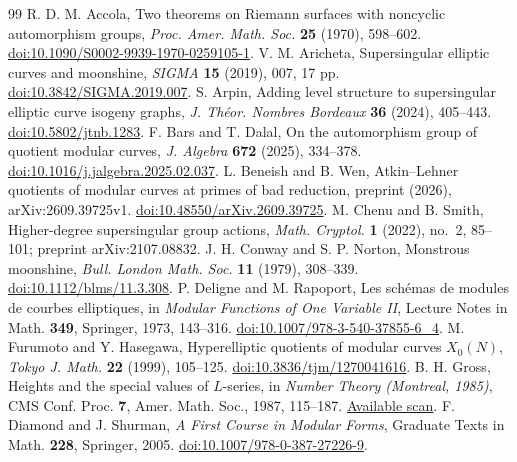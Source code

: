 \documentclass[11pt,a4paper]{article}
\theoremstyle{remark}\newtheorem{remark}[theorem]{Remark}
\numberwithin{equation}{section}
\begin{document}
	\begin{thebibliography}{99}\small
		 R. D. M. Accola, Two theorems on Riemann surfaces with noncyclic automorphism groups, \emph{Proc. Amer. Math. Soc.} \textbf{25} (1970), 598--602. \href{https://doi.org/10.1090/S0002-9939-1970-0259105-1}{doi:10.1090/S0002-9939-1970-0259105-1}.
		 V. M. Aricheta, Supersingular elliptic curves and moonshine, \emph{SIGMA} \textbf{15} (2019), 007, 17 pp. \href{https://doi.org/10.3842/SIGMA.2019.007}{doi:10.3842/SIGMA.2019.007}.
	 S. Arpin, Adding level structure to supersingular elliptic curve isogeny graphs, \emph{J. Th\'eor. Nombres Bordeaux} \textbf{36} (2024), 405--443. \href{https://doi.org/10.5802/jtnb.1283}{doi:10.5802/jtnb.1283}.
	 F. Bars and T. Dalal, On the automorphism group of quotient modular curves, \emph{J. Algebra} \textbf{672} (2025), 334--378. \href{https://doi.org/10.1016/j.jalgebra.2025.02.037}{doi:10.1016/j.jalgebra.2025.02.037}.
	 L. Beneish and B. Wen, Atkin--Lehner quotients of modular curves at primes of bad reduction, preprint (2026), arXiv:2609.39725v1. \href{https://doi.org/10.48550/arXiv.2609.39725}{doi:10.48550/arXiv.2609.39725}.
		 M. Chenu and B. Smith, Higher-degree supersingular group actions, \emph{Math. Cryptol.} \textbf{1} (2022), no.~2, 85--101; preprint arXiv:2107.08832.
		 J. H. Conway and S. P. Norton, Monstrous moonshine, \emph{Bull. London Math. Soc.} \textbf{11} (1979), 308--339. \href{https://doi.org/10.1112/blms/11.3.308}{doi:10.1112/blms/11.3.308}.
		 P. Deligne and M. Rapoport, Les sch\'emas de modules de courbes elliptiques, in \emph{Modular Functions of One Variable II}, Lecture Notes in Math. \textbf{349}, Springer, 1973, 143--316. \href{https://doi.org/10.1007/978-3-540-37855-6_4}{doi:10.1007/978-3-540-37855-6\_4}.
		 M. Furumoto and Y. Hasegawa, Hyperelliptic quotients of modular curves $X_0(N)$, \emph{Tokyo J. Math.} \textbf{22} (1999), 105--125. \href{https://doi.org/10.3836/tjm/1270041616}{doi:10.3836/tjm/1270041616}.
		 B. H. Gross, Heights and the special values of $L$-series, in \emph{Number Theory (Montreal, 1985)}, CMS Conf. Proc. \textbf{7}, Amer. Math. Soc., 1987, 115--187. \href{https://wstein.org/papers/bib/Gross-Heights_and_the_Special_Values_of_L-series.pdf}{Available scan}.
		 F. Diamond and J. Shurman, \emph{A First Course in Modular Forms}, Graduate Texts in Math. \textbf{228}, Springer, 2005. \href{https://doi.org/10.1007/978-0-387-27226-9}{doi:10.1007/978-0-387-27226-9}.

\end{thebibliography}
\end{document}
